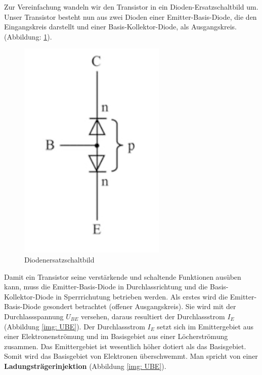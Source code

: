 Zur Vereinfachung wandeln wir den Transistor in ein Dioden-Ersatzschaltbild um. Unser Transistor besteht nun aus zwei Dioden einer Emitter-Basis-Diode, die den Eingangskreis darstellt und einer Basis-Kollektor-Diode, als Ausgangskreis. (Abbildung: \ref{img: Diodeersatzschaltbild}). 

\begin{figure}[!htb]
	\centering
	\includegraphics[scale=0.8]{images/Diodenersatzschaltbild.png} 
	\caption{Diodenersatzschaltbild \cite{Stiny2018} }
	\label{img: Diodeersatzschaltbild}
\end{figure}

Damit ein Transistor seine verstärkende und schaltende Funktionen ausüben kann, muss die Emitter-Basis-Diode in Durchlassrichtung und die Basis-Kollektor-Diode in Sperrrichutung betrieben werden. 
Als erstes wird die Emitter-Basis-Diode gesondert betrachtet (offener Ausgangskreis). Sie wird mit der Durchlassspannung $U_{BE}$ versehen, daraus resultiert der Durchlassstrom $I_E$ (Abbildung \ref{img: UBE}). Der Durchlassstrom $I_E$ setzt sich im Emittergebiet aus einer Elektronenströmung und im Basisgebiet aus einer Löcherströmung zusammen. Das Emittergebiet ist wesentlich höher dotiert als das Basisgebiet. Somit wird das Basisgebiet von Elektronen überschwemmt. Man spricht von einer \textbf{Ladungsträgerinjektion} (Abbildung \ref{img: UBE}).

